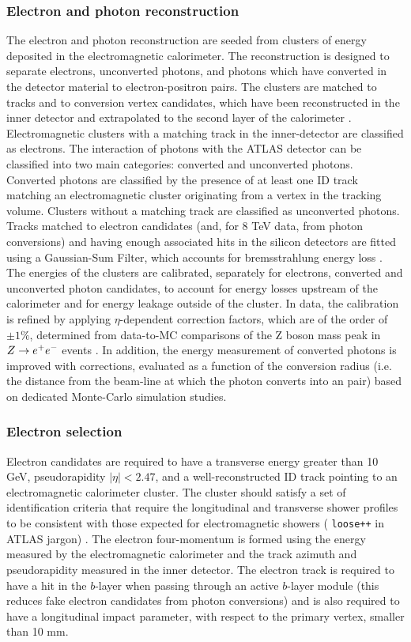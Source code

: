 \subsubsection*{Electron and photon reconstruction}
The electron and photon reconstruction are seeded from clusters of energy deposited
in the electromagnetic calorimeter. The reconstruction is designed to separate 
electrons, unconverted photons, and photons which have converted in the detector
material to electron-positron pairs. The clusters are matched to tracks and to 
conversion vertex candidates, which have 
been reconstructed in the inner detector and extrapolated to the second layer of
the calorimeter \cite{ATL-PHYS-PUB-2011-007}.
Electromagnetic clusters with a matching track in the inner-detector are classified
as electrons. The interaction of photons with the ATLAS detector can be
classified into two main categories: converted and unconverted photons. Converted
photons are classified by the presence of at least one ID track matching an
electromagnetic cluster originating from a vertex in the tracking volume. Clusters
without a matching track are classified as unconverted photons. Tracks matched
to electron candidates (and, for 8 TeV data, from photon conversions) and having
enough associated hits in the silicon detectors are fitted using a Gaussian-Sum
Filter, which accounts for bremsstrahlung energy loss \cite{ATLAS-CONF-2012-047}.
The energies of the clusters are calibrated, separately for electrons, converted
and unconverted photon candidates, to account for energy losses upstream of the 
calorimeter and for energy leakage outside of the cluster. In data, the calibration 
is refined by applying $\eta$-dependent correction factors, which are of the order
of $\pm 1\%$, determined from data-to-MC comparisons of the Z boson mass peak in
$Z \rightarrow e^+ e^-$ events \cite{Aad:2011mk}. 
In addition, the energy measurement of converted
photons is improved with corrections, evaluated as a function of the conversion
radius (i.e. the distance from the beam-line at which the photon converts into an
\epem pair) based on dedicated Monte-Carlo simulation studies.

\subsubsection*{Electron selection}
Electron candidates are required to have a transverse energy greater than 10 GeV,
pseudorapidity $|\eta| < 2.47$, and a well-reconstructed ID track pointing to an 
electromagnetic calorimeter cluster. The cluster should satisfy a set of 
identification criteria that require the longitudinal and transverse shower
profiles to be consistent with those expected for electromagnetic showers (
{\tt loose++} in ATLAS jargon) \cite{Aad:2011mk}. The electron four-momentum is formed
using the energy measured by the electromagnetic 
calorimeter and the track azimuth
and pseudorapidity measured in the inner detector. The electron track is required
to have a hit in the $b$-layer when passing through an active $b$-layer module
(this reduces fake electron candidates from photon conversions)
and is also required to have a longitudinal impact parameter, with respect to
the primary vertex, smaller than 10 mm.


